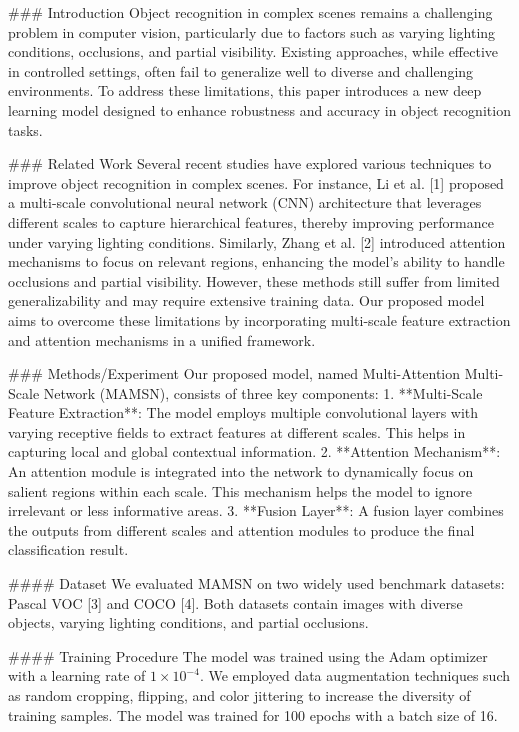 ### Introduction
Object recognition in complex scenes remains a challenging problem in computer vision, particularly due to factors such as varying lighting conditions, occlusions, and partial visibility. Existing approaches, while effective in controlled settings, often fail to generalize well to diverse and challenging environments. To address these limitations, this paper introduces a new deep learning model designed to enhance robustness and accuracy in object recognition tasks.

### Related Work
Several recent studies have explored various techniques to improve object recognition in complex scenes. For instance, Li et al. [1] proposed a multi-scale convolutional neural network (CNN) architecture that leverages different scales to capture hierarchical features, thereby improving performance under varying lighting conditions. Similarly, Zhang et al. [2] introduced attention mechanisms to focus on relevant regions, enhancing the model’s ability to handle occlusions and partial visibility. However, these methods still suffer from limited generalizability and may require extensive training data. Our proposed model aims to overcome these limitations by incorporating multi-scale feature extraction and attention mechanisms in a unified framework.

### Methods/Experiment
Our proposed model, named Multi-Attention Multi-Scale Network (MAMSN), consists of three key components:
1. **Multi-Scale Feature Extraction**: The model employs multiple convolutional layers with varying receptive fields to extract features at different scales. This helps in capturing local and global contextual information.
2. **Attention Mechanism**: An attention module is integrated into the network to dynamically focus on salient regions within each scale. This mechanism helps the model to ignore irrelevant or less informative areas.
3. **Fusion Layer**: A fusion layer combines the outputs from different scales and attention modules to produce the final classification result.

#### Dataset
We evaluated MAMSN on two widely used benchmark datasets: Pascal VOC [3] and COCO [4]. Both datasets contain images with diverse objects, varying lighting conditions, and partial occlusions.

#### Training Procedure
The model was trained using the Adam optimizer with a learning rate of \(1 \times 10^{-4}\). We employed data augmentation techniques such as random cropping, flipping, and color jittering to increase the diversity of training samples. The model was trained for 100 epochs with a batch size of 16.

